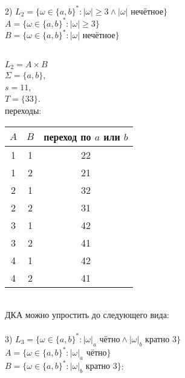 \documentclass[a4paper,12pt]{article}
\begin{document}
 



2) $ L_2=\{\omega \in\{a,b\}^* : |\omega| \geqslant 3 \wedge |\omega| \text{ нечётное} \} $ \\
$A=\{\omega \in\{a,b\}^* : |\omega| \geqslant 3\} $ \\
$B=\{\omega \in\{a,b\}^* : |\omega| \text{ нечётное} \} $


\\


$L_2=A \times B$\\
$\Sigma=\{a,b\}$, \\
$s=11$,\\
$T=\{33\}$.\\
переходы:\\
\begin{center}
    \begin{tabular}{ |c|c|c| } 
        \hline
        $A$ & $B$ & переход по $a$ или $b$ \\
        \hline
        1 & 1 & 22 \\
        \hline
        1 & 2 & 21 \\
        \hline
        2 & 1 & 32 \\
        \hline
        2 & 2 & 31 \\
        \hline
        3 & 1 & 42 \\
        \hline
        3 & 2 & 41 \\
        \hline
        4 & 1 & 42 \\
        \hline
        4 & 2 & 41 \\
        \hline
    \end{tabular}
\end{center}

 \\

ДКА можно упростить до следующего вида: \\

 \\



3) $L_3=\{\omega \in\{a,b\}^* : |\omega|_a \text{ чётно} \wedge |\omega|_b \text{ кратно } 3 \} $ \\
$A=\{\omega \in\{a,b\}^* : |\omega|_a \text{ чётно} \} $ \\
$B=\{\omega \in\{a,b\}^* : |\omega|_b \text{ кратно } 3 \} $:
\end{document}
